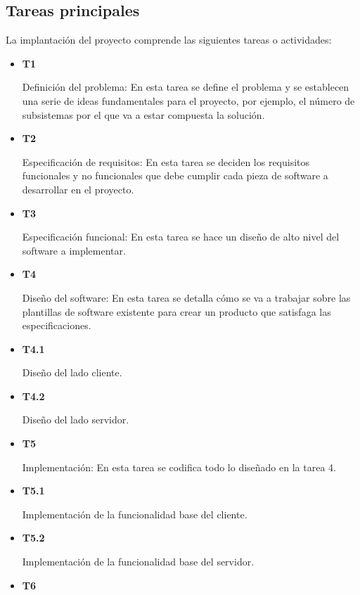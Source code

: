\subsection{Tareas principales}

La implantación del proyecto comprende las siguientes tareas o actividades: 

\begin{itemize}

	\item \textbf{T1}	

	Definición del problema: En esta tarea se define el problema y se establecen una serie de ideas fundamentales para el proyecto, por ejemplo, el número de subsistemas por el que va a estar compuesta la solución. 
	\item \textbf{T2}	

	Especificación de requisitos: En esta tarea se deciden los requisitos funcionales y no funcionales que debe cumplir cada pieza de software a desarrollar en el proyecto.

	\item \textbf{T3}	

	Especificación funcional: En esta tarea se hace un diseño de alto nivel del software a implementar.

	\item \textbf{T4}

	Diseño del software: En esta tarea se detalla cómo se va a trabajar sobre las plantillas de software existente para crear un producto que satisfaga las especificaciones.

	\item \textbf{T4.1}

	Diseño del lado cliente.

	\item \textbf{T4.2}	

	Diseño del lado servidor.

	\item \textbf{T5}

	Implementación: En esta tarea se codifica todo lo diseñado en la tarea 4.
	
	\item \textbf{T5.1}
	
	Implementación de la funcionalidad base del cliente.
	
	\item \textbf{T5.2}
	
	Implementación de la funcionalidad base del servidor.
	
	\item \textbf{T6}
	

\end{itemize}
